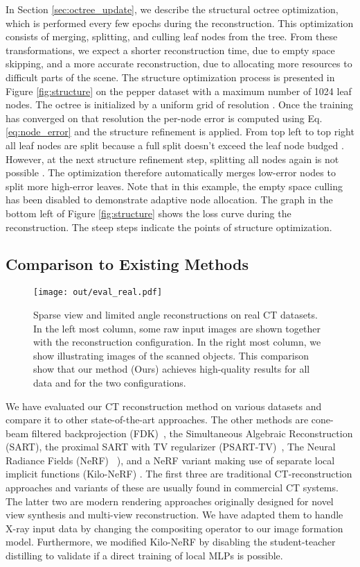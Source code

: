 \documentclass[acmtog,nonacm]{acmart} \acmSubmissionID{0438}
\begin{document}
In Section \ref{sec:octree_update}, we describe the structural octree optimization, which is performed every few epochs during the reconstruction.
This optimization consists of merging, splitting, and culling leaf nodes from the tree.
From these transformations, we expect a shorter reconstruction time, due to empty space skipping, and a more accurate reconstruction, due to allocating more resources to difficult parts of the scene.
The structure optimization process is presented in Figure \ref{fig:structure} on the pepper dataset with a maximum number of 1024 leaf nodes.
The octree is initialized by a uniform grid of resolution .
Once the training has converged on that resolution the per-node error is computed using Eq. \eqref{eq:node_error} and the structure refinement is applied.
From top left to top right all leaf nodes are split because a full split doesn't exceed the leaf node budged .
However, at the next structure refinement step, splitting all nodes again is not possible .
The optimization therefore automatically merges low-error nodes to split more high-error leaves.
Note that in this example, the empty space culling has been disabled to demonstrate adaptive node allocation.
The graph in the bottom left of Figure \ref{fig:structure} shows the loss curve during the reconstruction.
The steep steps indicate the points of structure optimization.


\subsection{Comparison to Existing Methods}


\begin{figure*}
\texttt{[image: out/eval\_real.pdf]}
	\caption{
		Sparse view and limited angle reconstructions on real CT datasets.
		In the left most column, some raw input images are shown together with the reconstruction configuration.
		In the right most column, we show illustrating images of the scanned objects.
		This comparison show that our method (Ours) achieves high-quality results for all data and for the two configurations.
	}
	\label{fig:real_recons}
\end{figure*}

We have evaluated our CT reconstruction method on various datasets and
compare it to other state-of-the-art approaches.  The other methods
are cone-beam filtered backprojection (FDK)~\cite{feldkamp1984practical}, 
the Simultaneous Algebraic Reconstruction
(SART)\cite{kak2001principles}, the proximal SART with TV regularizer
(PSART-TV)~\cite{zang2018super}, The Neural Radiance Fields (NeRF)
~\cite{mildenhall2020nerf}), and a NeRF variant making use of separate
local implicit functions (Kilo-NeRF) \cite{reiser2021kilonerf}.  The
first three are traditional CT-reconstruction approaches and variants
of these are usually found in commercial CT systems.  The latter two
are modern rendering approaches originally designed for novel view
synthesis and multi-view reconstruction. We have adapted them to
handle X-ray input data by changing the compositing operator to our
image formation model.  Furthermore, we modified Kilo-NeRF by
disabling the student-teacher distilling to validate if a direct
training of local MLPs is possible.
\end{document}
